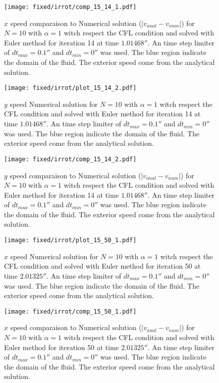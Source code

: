 \begin{figure}
\texttt{[image: fixed/irrot/comp\_15\_14\_1.pdf]}
\caption{$x$ speed comparaison to Numerical solution ($|v_{anal}-v_{num}|$) for $N=10$ with $\alpha=1$ witch respect the CFL condition and solved with Euler method
for iteration 14 at time $\unit{1.01468}{\second}$.
An time step limiter of $dt_{max}=\unit{0.1}{\second}$ and $dt_{min}=\unit{0}{\second}$ was used.
The blue region indicate the domain of the fluid. The exterior speed come from the analytical solution.
\label{fix:comp_15_14_1}
}
\end{figure}

\begin{figure}
\texttt{[image: fixed/irrot/plot\_15\_14\_2.pdf]}
\caption{$y$ speed Numerical solution for $N=10$ with $\alpha=1$ witch respect the CFL condition and solved with Euler method
for iteration 14 at time $\unit{1.01468}{\second}$.
An time step limiter of $dt_{max}=\unit{0.1}{\second}$ and $dt_{min}=\unit{0}{\second}$ was used.
The blue region indicate the domain of the fluid. The exterior speed come from the analytical solution.
\label{fix:plot_15_14_2}
}
\end{figure}

\begin{figure}
\texttt{[image: fixed/irrot/comp\_15\_14\_2.pdf]}
\caption{$y$ speed comparaison to Numerical solution ($|v_{anal}-v_{num}|$) for $N=10$ with $\alpha=1$ witch respect the CFL condition and solved with Euler method
for iteration 14 at time $\unit{1.01468}{\second}$.
An time step limiter of $dt_{max}=\unit{0.1}{\second}$ and $dt_{min}=\unit{0}{\second}$ was used.
The blue region indicate the domain of the fluid. The exterior speed come from the analytical solution.
\label{fix:comp_15_14_2}
}
\end{figure}

\begin{figure}
\texttt{[image: fixed/irrot/plot\_15\_50\_1.pdf]}
\caption{$x$ speed Numerical solution for $N=10$ with $\alpha=1$ witch respect the CFL condition and solved with Euler method
for iteration 50 at time $\unit{2.01325}{\second}$.
An time step limiter of $dt_{max}=\unit{0.1}{\second}$ and $dt_{min}=\unit{0}{\second}$ was used.
The blue region indicate the domain of the fluid. The exterior speed come from the analytical solution.
\label{fix:plot_15_50_1}
}
\end{figure}

\begin{figure}
\texttt{[image: fixed/irrot/comp\_15\_50\_1.pdf]}
\caption{$x$ speed comparaison to Numerical solution ($|v_{anal}-v_{num}|$) for $N=10$ with $\alpha=1$ witch respect the CFL condition and solved with Euler method
for iteration 50 at time $\unit{2.01325}{\second}$.
An time step limiter of $dt_{max}=\unit{0.1}{\second}$ and $dt_{min}=\unit{0}{\second}$ was used.
The blue region indicate the domain of the fluid. The exterior speed come from the analytical solution.
\label{fix:comp_15_50_1}
}
\end{figure}

